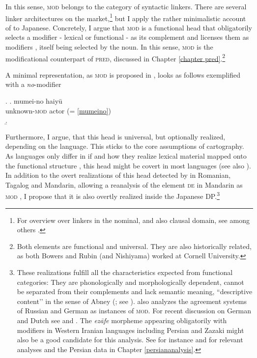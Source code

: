 \documentclass [output=book,colorlinks,citecolor=brown]{langscibook}
\begin{document}
In this sense, \textsc{mod} belongs to the category of syntactic linkers. There are several linker architectures on the market,\footnote{For overview over linkers in the nominal, and also clausal domain, see among others \citealt{baker:2006:linkers, philip:2012:linkers, franco:2015:linkers, richards:2023:finding}.}  but I apply the rather minimalistic account of \citet{rubin:1994:mod, rubin:1996:transparent} to Japanese. Concretely, I argue that \textsc{mod} is a functional head that obligatorily selects a modifier - lexical or functional - as its complement and licenses them as modifiers \citep[36–40]{rubin:1994:mod}, itself being selected by the noun. In this sense, \textsc{mod} is the modificational counterpart of \textsc{pred}, discussed in Chapter \ref{chapter pred}.\footnote{Both elements are functional and universal. They are also historically related, as both Bowers and Rubin (and Nishiyama) worked at Cornell University.}

 A minimal representation, as \textsc{mod} is proposed in \citet{rubin:1994:mod}, looks as follows exemplified with a \textit{no}-modifier

\ex. \label{mumeimod} \ag. mumei-no haiyū\\
unknown-\textsc{mod} actor (= \ref{mumeino})\\
\b. 

Furthermore, I argue, that this head is universal, but optionally realized, depending on the language. This sticks to the core assumptions of cartography. As languages only differ in if and how they realize lexical material mapped onto the functional structure \citep{rizzi:1997:the, shlonsky:2004:form, bortolotto:2016:RA, cinriz:2010:carto, cinriz:2016:functional}, this head might be covert in most languages (see also \citealt{richards:2023:finding}). In addition to the overt realizations of this head detected by \citet[ch. 2.2 + 2.3]{rubin:1994:mod} in Romanian, Tagalog and Mandarin, allowing a reanalysis of the element \textsc{de} in Mandarin as \textsc{mod} \citep[97–102]{rubin:1994:mod}, I propose that it is also overtly realized inside the Japanese DP.\footnote{These realizations fulfill all the characteristics expected from functional categories: They are phonologically and morphologically dependent, cannot be separated from their complements and lack semantic meaning, ``descriptive content’’ in the sense of Abney (\citeyear[65–66]{abney:1987:the}; see \citealt[34]{rubin:1994:mod}). \citet[ch. 2.2 + 2.3]{rubin:1994:mod} also analyzes the agreement systems of Russian and German as instances of \textsc{mod}. For recent discussion on German and Dutch see \citet{zeijlstra:2020:agree} and \citet{alexeyenko:2021:hff}. The \textit{ezāfe} morpheme appearing obligatorily with modifiers in Western Iranian languages including Persian and Zazaki might also be a good candidate for this analysis. See for instance \citet{toosarvandani:2014:the, franco:2015:linkers} and \citet{gn:2024:morpho} for relevant analyses and the Persian data in Chapter \ref{persiananalysis}.}
\end{document}
